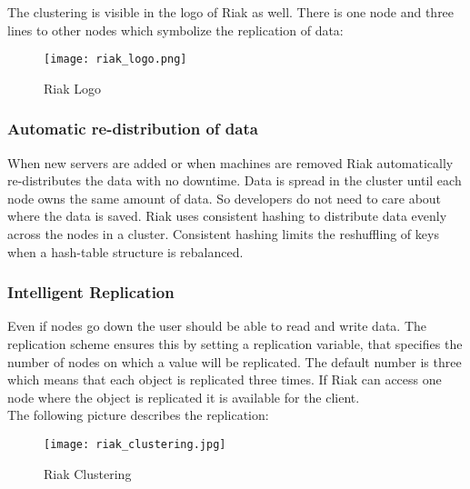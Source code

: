 The clustering is visible in the logo of Riak as well. There is one node and three lines to other nodes which symbolize the replication of data:
\begin{figure}[h!]
	\centering
	\texttt{[image: riak\_logo.png]}
	\caption[Riak Logo \protect\cite{Basho.06.04.2017}]{Riak Logo \protect\cite{Basho.06.04.2017}}
	\label{Riak Logo}
\end{figure}

\subsubsection{Automatic re-distribution of data}
When new servers are added or when machines are removed Riak automatically re-distributes the data with no downtime. Data is spread in the cluster until each node owns the same amount of data. So developers do not need to care about where the data is saved. Riak uses consistent hashing to distribute data evenly across the nodes in a cluster. Consistent hashing limits the reshuffling of keys when a hash-table structure is rebalanced. \cite{Basho.06.04.2017}
\subsubsection{Intelligent Replication}
Even if nodes go down the user should be able to read and write data. The replication scheme ensures this by setting a replication variable, that specifies the number of nodes on which a value will be replicated. The default number is three which means that each object is replicated three times. If Riak can access one node where the object is replicated it is available for the client. \cite{Basho.06.04.2017}
\\ 
The following picture describes the replication: 
\begin{figure}[h]
	\centering
	\texttt{[image: riak\_clustering.jpg]}
	\caption{Riak Clustering}
	\label{Riak Clustering}
\end{figure}